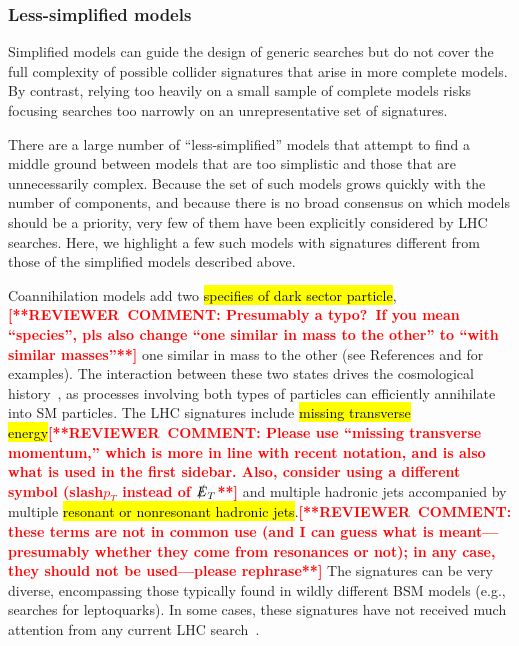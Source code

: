 \documentclass{ar-1col}
\newcommand{\MET}{\ensuremath{\slashed{E}_T}\xspace}
\begin{document}
\subsubsection{Less-simplified models}\label{sec:LessSimplifiedModels}

Simplified models can guide the design of generic searches but do
not cover the full complexity of possible collider signatures that
arise in more complete models. By contrast, relying too
heavily on a small sample of complete models risks focusing
searches too narrowly on an unrepresentative set of signatures.

There are a large number of ``less-simplified'' models that
attempt to find a middle ground between models that are too
simplistic and those that are unnecessarily complex. Because the
set of such models grows quickly with the number of components,
and because there is no broad consensus on which models should be a
priority, very few of them have been explicitly considered by LHC
searches. Here, we highlight a few such models with signatures different from those of
 the simplified models described above.

{Coannihilation} models add two \hl{specifies of dark sector
particle},\textbf{\textcolor{red}{[**REVIEWER\ COMMENT: Presumably a typo?\ If you mean ``species'', pls also change ``one similar in mass to the other'' to ``with similar masses''**]}} one similar in mass to the other (see References  and  for examples). The interaction
between these two states drives the cosmological
history~\cite{Ellis:1999mm}, as processes involving both types of
particles can efficiently annihilate into SM particles. The LHC
signatures include \hl{missing transverse energy}\textbf{\textcolor{red}{[**REVIEWER\ COMMENT: Please use ``missing transverse momentum,'' which is more in line with recent notation, and is also what is used in the first sidebar. Also, consider using a different symbol (slash${p_T}$ instead of \MET**]}} and multiple hadronic
jets accompanied by multiple \hl{resonant or nonresonant hadronic
jets}.\textbf{\textcolor{red}{[**REVIEWER\ COMMENT: these terms are not in common use (and I can guess what is meant---presumably whether they come from resonances or not); in any case, they should not be used---please rephrase**]}} The signatures can be very diverse, encompassing those typically
found in wildly different BSM models (e.g., searches for
leptoquarks). In some cases, these signatures have not received much attention from any
current LHC search~\cite{Buschmann:2016hkc}.
\end{document}
